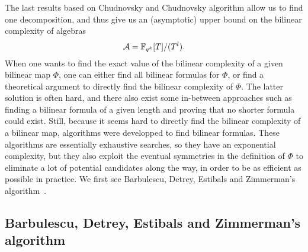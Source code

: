 The last results based on Chudnovsky and Chudnovsky algorithm allow us to find
one decomposition, and thus give us an (asymptotic) upper bound on the bilinear
complexity of algebras
\[
  \mathcal{A} = \mathbb{F}_{q^k}[T]/(T^l).
\]
When one wants to find the exact value of the bilinear complexity of a given
bilinear map $\Phi$, one can either find all bilinear formulas for $\Phi$, or
find a theoretical argument to directly find the bilinear complexity of $\Phi$. The latter
solution is often hard, and there also exist some in-between approaches such
as finding a bilinear formula of a given length and proving that no shorter formula
could exist. Still, because it seems hard to directly find the bilinear
complexity of a bilinear map, algorithms were developped to find bilinear
formulas. These algorithms are essentially exhaustive searches, so they 
have an exponential complexity, but they also exploit the eventual symmetries
in the definition of $\Phi$ to eliminate a lot of potential candidates along the
way, in order to be as efficient as possible in practice. We first see
Barbulescu, Detrey, Estibals and Zimmerman's algorithm~\cite{BDEZ12}.

\subsection{Barbulescu, Detrey, Estibals and Zimmerman's algorithm}

